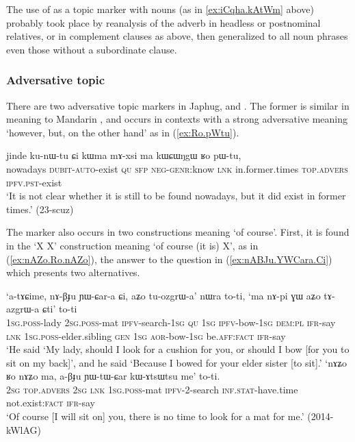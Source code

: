 The use of  as a topic marker with nouns (as in \ref{ex:iCqha.kAtWm} above) probably took place by reanalysis of the adverb in headless or postnominal relatives, or in complement clauses as above, then generalized to all noun phrases even those without a subordinate clause.

 \subsubsection{Adversative topic} \label{sec:adversative.topic}
There are two adversative topic markers in Japhug,  and . The former is similar in meaning to Mandarin , and occurs in contexts with a strong adversative meaning `however, but, on the other hand' as in (\ref{ex:Ro.pWtu}).

\begin{exe}
\ex \label{ex:Ro.pWtu}
\gll jinde ku-nɯ-tu ɕi kɯma mɤ-xsi ma kɯɕɯŋgɯ ʁo pɯ-tu, \\
nowadays \textsc{dubit}-\textsc{auto}-exist \textsc{qu} \textsc{sfp} \textsc{neg}-\textsc{genr}:know \textsc{lnk} in.former.times \textsc{top}.\textsc{advers} \textsc{ipfv}.\textsc{pst}-exist \\
\glt `It is not clear whether it is still to be found nowadays, but it did exist in former times.' (23-scuz)
\end{exe}

The marker  also occurs in two constructions meaning `of course'. First, it is found in the `X  X' construction meaning `of course (it is)  X', as in (\ref{ex:nAZo.Ro.nAZo}), the answer to the question in (\ref{ex:nABJu.YWCara.Ci}) which presents two alternatives.

\begin{exe}
\ex
\begin{xlist}
\ex  \label{ex:nABJu.YWCara.Ci}
\gll `a-tɤɕime, nɤ-βɟu ɲɯ-ɕar-a ɕi, aʑo tu-ozgrɯ-a' nɯra to-ti, `ma nɤ-pi ɣɯ aʑo tɤ-azgrɯ-a ɕti' to-ti  \\
\textsc{1sg}.\textsc{poss}-lady \textsc{2sg}.\textsc{poss}-mat \textsc{ipfv}-search-\textsc{1sg} \textsc{qu} \textsc{1sg} \textsc{ipfv}-bow-\textsc{1sg} \textsc{dem}:\textsc{pl} \textsc{ifr}-say \textsc{lnk} \textsc{1sg}.\textsc{poss}-elder.sibling \textsc{gen} \textsc{1sg} \textsc{aor}-bow-\textsc{1sg} be.\textsc{aff}:\textsc{fact} \textsc{ifr}-say \\
\glt `He said `My lady, should I look for a cushion for you, or should I bow [for you to sit on my back]', and he said  `Because I bowed for your elder sister [to sit].'
\ex  \label{ex:nAZo.Ro.nAZo}
\gll  `nɤʑo ʁo nɤʑo ma, a-βɟu ɲɯ-tɯ-ɕar kɯ-ɤtsɯtsu me' to-ti.   \\
\textsc{2sg} \textsc{top}.\textsc{advers} \textsc{2sg} \textsc{lnk} \textsc{1sg}.\textsc{poss}-mat \textsc{ipfv}-2-search \textsc{inf}.\textsc{stat}-have.time  not.exist:\textsc{fact} \textsc{ifr}-say \\
\glt  `Of course [I will sit on] you, there is no time to look for a mat for me.' (2014-kWlAG)
\end{xlist}
\end{exe}

